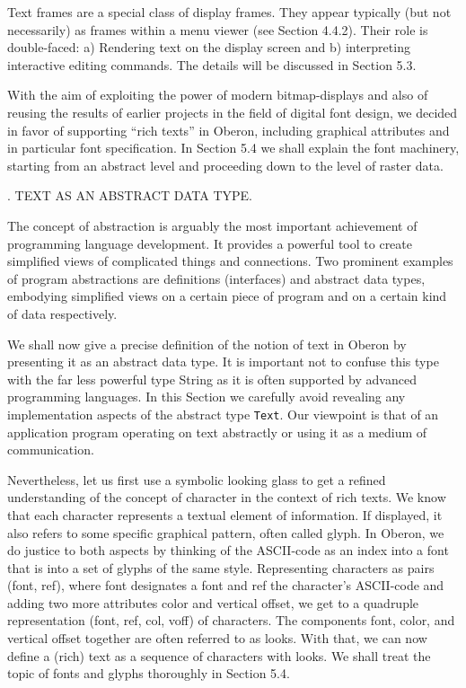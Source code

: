Text frames are a special class of display frames. They appear
typically (but not necessarily) as frames within a menu viewer (see
Section 4.4.2). Their role is double-faced: a) Rendering text on the
display screen and b) interpreting interactive editing commands. The
details will be discussed in Section 5.3.

With the aim of exploiting the power of modern bitmap-displays and
also of reusing the results of earlier projects in the field of
digital font design, we decided in favor of supporting ``rich texts'' in
Oberon, including graphical attributes and in particular font
specification. In Section 5.4 we shall explain the font machinery,
starting from an abstract level and proceeding down to the level of
raster data.

. TEXT AS AN ABSTRACT DATA TYPE.

The concept of abstraction is arguably the most important achievement
of programming language development. It provides a powerful tool to
create simplified views of complicated things and connections. Two
prominent examples of program abstractions are definitions
(interfaces) and abstract data types, embodying simplified views on a
certain piece of program and on a certain kind of data respectively.

We shall now give a precise definition of the notion of text in Oberon
by presenting it as an abstract data type. It is important not to
confuse this type with the far less powerful type String as it is
often supported by advanced programming languages. In this Section we
carefully avoid revealing any implementation aspects of the abstract
type {\tt Text\/}. Our viewpoint is that of an application program operating
on text abstractly or using it as a medium of communication.

Nevertheless, let us first use a symbolic looking glass to get a
refined understanding of the concept of character in the context of
rich texts. We know that each character represents a textual element
of information. If displayed, it also refers to some specific
graphical pattern, often called glyph. In Oberon, we do justice to
both aspects by thinking of the ASCII-code as an index into a font
that is into a set of glyphs of the same style. Representing
characters as pairs (font, ref), where font designates a font and ref
the character's ASCII-code and adding two more attributes color and
vertical offset, we get to a quadruple representation (font, ref, col,
voff) of characters. The components font, color, and vertical offset
together are often referred to as looks. With that, we can now define
a (rich) text as a sequence of characters with looks. We shall treat
the topic of fonts and glyphs thoroughly in Section 5.4.

